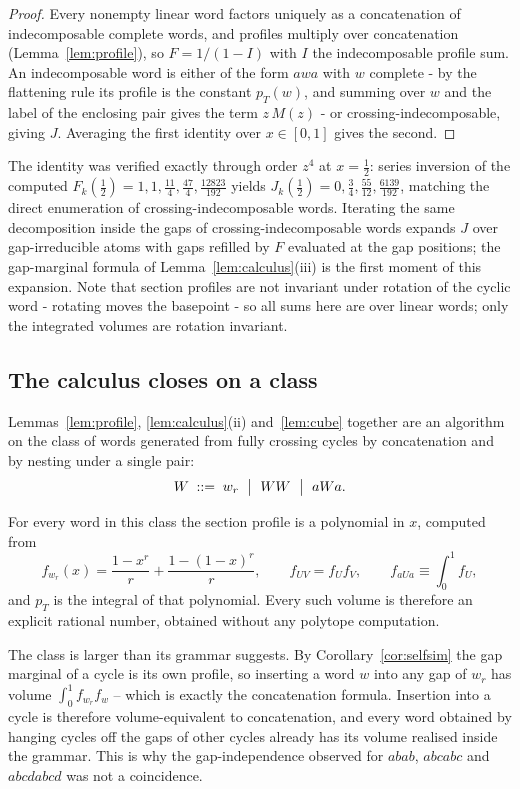 \begin{proof}
Every nonempty linear word factors uniquely as a concatenation of
indecomposable complete words, and profiles multiply over concatenation
(Lemma~\ref{lem:profile}), so $F=1/(1-I)$ with $I$ the indecomposable
profile sum.  An indecomposable word is either of the form $awa$ with
$w$ complete - by the flattening rule its profile is the constant
$p_T(w)$, and summing over $w$ and the label of the enclosing pair gives
the term $z\,M(z)$ - or crossing-indecomposable, giving $J$.  Averaging
the first identity over $x\in[0,1]$ gives the second.
\end{proof}

The identity was verified exactly through order $z^4$ at $x=\tfrac12$:
series inversion of the computed $F_k(\tfrac12)=1,1,\tfrac{11}4,
\tfrac{47}4,\tfrac{12823}{192}$ yields
$J_k(\tfrac12)=0,\tfrac34,\tfrac{55}{12},\tfrac{6139}{192}$, matching
the direct enumeration of crossing-indecomposable words.  Iterating the
same decomposition inside the gaps of crossing-indecomposable words
expands $J$ over gap-irreducible atoms with gaps refilled by $F$
evaluated at the gap positions; the gap-marginal formula of
Lemma~\ref{lem:calculus}(iii) is the first moment of this expansion.
Note that section profiles are not invariant under rotation of the
cyclic word - rotating moves the basepoint - so all sums here are over
linear words; only the integrated volumes are rotation invariant.

\subsection*{The calculus closes on a class}

Lemmas~\ref{lem:profile}, \ref{lem:calculus}(ii) and~\ref{lem:cube}
together are an algorithm on the class of words generated from fully
crossing cycles by concatenation and by nesting under a single pair:
\[
W\;::=\;w_r\ \bigm|\ WW\ \bigm|\ aWa .
\]

\begin{proposition}\label{prop:closure}
For every word in this class the section profile is a polynomial in $x$,
computed from
\[
f_{w_r}(x)=\frac{1-x^r}{r}+\frac{1-(1-x)^r}{r},\qquad
f_{UV}=f_Uf_V,\qquad
f_{aUa}\equiv\int_0^1 f_U ,
\]
and $p_T$ is the integral of that polynomial.  Every such volume is
therefore an explicit rational number, obtained without any polytope
computation.
\end{proposition}

The class is larger than its grammar suggests.  By
Corollary~\ref{cor:selfsim} the gap marginal of a cycle is its own
profile, so inserting a word $w$ into any gap of $w_r$ has volume
$\int_0^1f_{w_r}f_w$ -- which is exactly the concatenation formula.
Insertion into a cycle is therefore volume-equivalent to concatenation,
and every word obtained by hanging cycles off the gaps of other cycles
already has its volume realised inside the grammar.  This is why the
gap-independence observed for $abab$, $abcabc$ and $abcdabcd$ was not a
coincidence.


